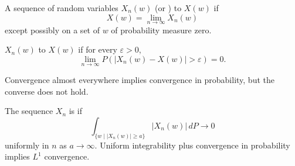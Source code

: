 A sequence of random variables $X_n(w)$  (or ) to $X(w)$ if
$$X(w) = \lim_{n \to \infty} X_n(w)$$
except possibly on a set of $w$ of probability measure zero.

$X_n(w)$  to $X(w)$ if for every $\varepsilon > 0$,
$$\lim_{n \to \infty} P(|X_n(w) - X(w)| > \varepsilon) = 0.$$

Convergence almost everywhere implies convergence in probability, but the converse does not hold.

The sequence $X_n$ is  if
$$\int_{\{w \mid |X_n(w)| \geq a\}} |X_n(w)| \, dP \to 0$$
uniformly in $n$ as $a \to \infty$. Uniform integrability plus convergence in probability implies $L^1$ convergence.
